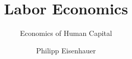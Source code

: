 

\title{Labor Economics}
\subtitle{Economics of Human Capital}
\author{Philipp Eisenhauer}

\date{}

\let\otp\titlepage
